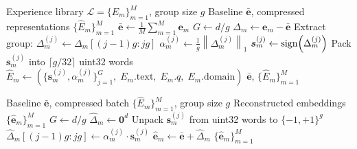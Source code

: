 \begin{algorithm}[H]
\caption{\textsc{BitDelta-Compress}}
\label{alg:compress}
\begin{algorithmic}[1]
\Require Experience library $\mathcal{L} = \{E_m\}_{m=1}^M$, group size $g$
\Ensure Baseline $\bar{\bm{e}}$, compressed representations $\{\widehat{E}_m\}_{m=1}^M$
\State $\bar{\bm{e}} \gets \frac{1}{M}\sum_{m=1}^M \bm{e}_m$ 
\State $G \gets d / g$ 
    \State $\Delta_m \gets \bm{e}_m - \bar{\bm{e}}$ 
        \State Extract group: $\Delta_m^{(j)} \gets \Delta_m[(j-1)g : jg]$
        \State $\alpha_m^{(j)} \gets \frac{1}{g}\left\|\Delta_m^{(j)}\right\|_1$
        \State $\bm{s}_m^{(j)} \gets \operatorname{sign}\!\left(\Delta_m^{(j)}\right)$
        \State Pack $\bm{s}_m^{(j)}$ into $\lceil g/32 \rceil$ uint32 words
    \EndFor
    \State $\widehat{E}_m \gets \left(\{\bm{s}_m^{(j)}, \alpha_m^{(j)}\}_{j=1}^G,\;
           E_m.\text{text},\; E_m.q,\; E_m.\text{domain}\right)$
\EndFor
\State \Return $\bar{\bm{e}}$, $\{\widehat{E}_m\}_{m=1}^M$
\end{algorithmic}
\end{algorithm}

\begin{algorithm}[H]
\caption{\textsc{BitDelta-Decompress}}
\label{alg:decompress}
\begin{algorithmic}[1]
\Require Baseline $\bar{\bm{e}}$, compressed batch $\{\widehat{E}_m\}_{m=1}^M$, group size $g$
\Ensure Reconstructed embeddings $\{\hat{\bm{e}}_m\}_{m=1}^M$
\State $G \gets d / g$
    \State $\hat{\Delta}_m \gets \bm{0}^d$
        \State Unpack $\bm{s}_m^{(j)}$ from uint32 words to $\{-1,+1\}^g$
        \State $\hat{\Delta}_m[(j-1)g : jg] \gets \alpha_m^{(j)} \cdot \bm{s}_m^{(j)}$
    \EndFor
    \State $\hat{\bm{e}}_m \gets \bar{\bm{e}} + \hat{\Delta}_m$
\EndFor
\State \Return $\{\hat{\bm{e}}_m\}_{m=1}^M$
\end{algorithmic}
\end{algorithm}

